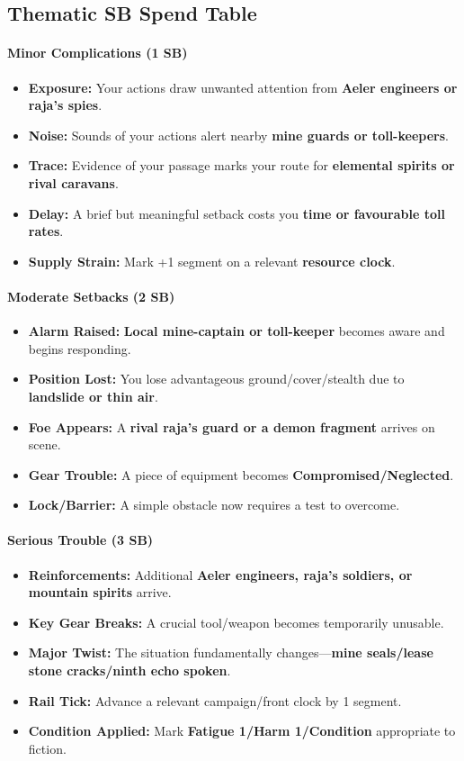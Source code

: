 \subsection*{Thematic SB Spend Table}
\label{sec:satrapies-sb}

\paragraph{Minor Complications (1 SB)}
\begin{itemize}
\item \textbf{Exposure:} Your actions draw unwanted attention from \textbf{Aeler engineers or raja's spies}.
\item \textbf{Noise:} Sounds of your actions alert nearby \textbf{mine guards or toll-keepers}.
\item \textbf{Trace:} Evidence of your passage marks your route for \textbf{elemental spirits or rival caravans}.
\item \textbf{Delay:} A brief but meaningful setback costs you \textbf{time or favourable toll rates}.
\item \textbf{Supply Strain:} Mark +1 segment on a relevant \textbf{resource clock}.
\end{itemize}

\paragraph{Moderate Setbacks (2 SB)}
\begin{itemize}
\item \textbf{Alarm Raised:} \textbf{Local mine-captain or toll-keeper} becomes aware and begins responding.
\item \textbf{Position Lost:} You lose advantageous ground/cover/stealth due to \textbf{landslide or thin air}.
\item \textbf{Foe Appears:} A \textbf{rival raja's guard or a demon fragment} arrives on scene.
\item \textbf{Gear Trouble:} A piece of equipment becomes \textbf{Compromised/Neglected}.
\item \textbf{Lock/Barrier:} A simple obstacle now requires a test to overcome.
\end{itemize}

\paragraph{Serious Trouble (3 SB)}
\begin{itemize}
\item \textbf{Reinforcements:} Additional \textbf{Aeler engineers, raja's soldiers, or mountain spirits} arrive.
\item \textbf{Key Gear Breaks:} A crucial tool/weapon becomes temporarily unusable.
\item \textbf{Major Twist:} The situation fundamentally changes—\textbf{mine seals/lease stone cracks/ninth echo spoken}.
\item \textbf{Rail Tick:} Advance a relevant campaign/front clock by 1 segment.
\item \textbf{Condition Applied:} Mark \textbf{Fatigue 1/Harm 1/Condition} appropriate to fiction.
\end{itemize}

